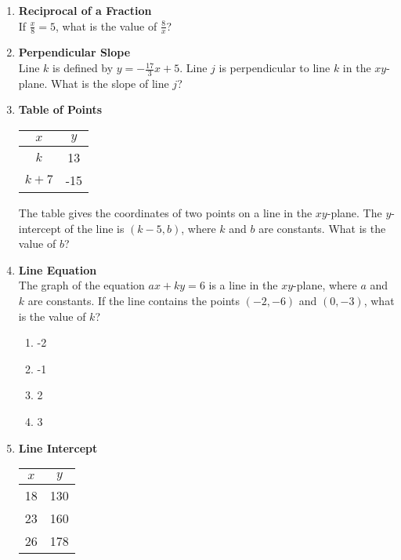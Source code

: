 \begin{enumerate}
\item \textbf{Reciprocal of a Fraction}\\
If $\frac{x}{8} = 5$, what is the value of $\frac{8}{x}$?
\begin{subanswer}
\end{subanswer}

\item \textbf{Perpendicular Slope}\\
Line $k$ is defined by $y = -\frac{17}{3}x + 5$. Line $j$ is perpendicular to line $k$ in the $xy$-plane. What is the slope of line $j$?
\begin{subanswer}
\end{subanswer}

\item \textbf{Table of Points}\\
\begin{center}
\begin{tabular}{|c|c|}
\hline
$x$ & $y$ \\
\hline
$k$ & 13 \\
\hline
$k+7$ & -15 \\
\hline
\end{tabular}
\end{center}

The table gives the coordinates of two points on a line in the $xy$-plane. The $y$-intercept of the line is $(k-5, b)$, where $k$ and $b$ are constants. What is the value of $b$?
\begin{subanswer}
\end{subanswer}

\item \textbf{Line Equation}\\
The graph of the equation $ax + ky = 6$ is a line in the $xy$-plane, where $a$ and $k$ are constants. If the line contains the points $(-2, -6)$ and $(0, -3)$, what is the value of $k$?
\begin{enumerate}[label=(\Alph*)]
  \item -2
  \item -1
  \item 2
  \item 3
\end{enumerate}
\begin{subanswer}
\end{subanswer}

\newpage

\item \textbf{Line Intercept}\\
\begin{center}
\begin{tabular}{|c|c|}
\hline
$x$ & $y$ \\
\hline
18 & 130 \\
\hline
23 & 160 \\
\hline
26 & 178 \\
\hline
\end{tabular}
\end{center}


\end{enumerate}
